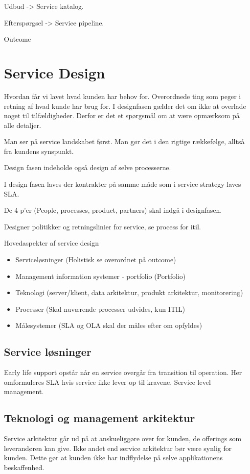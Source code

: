 Udbud -> Service katalog.

Efterspørgsel -> Service pipeline.

Outcome


\section{Service Design}
Hvordan får vi lavet hvad kunden har behov for. Overordnede ting som peger i retning af hvad kunde har brug for. I designfasen gælder det om ikke at overlade noget til tilfældigheder. Derfor er det et spørgsmål om at være opmærksom på alle detaljer.

Man ser på service landskabet først. Man gør det i den rigtige rækkefølge, alltså fra kundens synspunkt.

Design fasen indeholde også design af selve processerne.

I design fasen laves der kontrakter på samme måde som i service strategy laves SLA.

De 4 p'er (People, processes, product, partners) skal indgå i designfasen.

Designer politikker og retningslinier for service, se process for itil.

Hovedaspekter af service design
\begin{itemize}
\item Serviceløsninger (Holistisk se overordnet på outcome)
\item Management information systemer - portfolio (Portfolio)
\item Teknologi (server/klient, data arkitektur, produkt arkitektur, monitorering)
\item Processer (Skal nuværende processer udvides, kun ITIL)
\item Målesystemer (SLA og OLA skal der måles efter om opfyldes)
\end{itemize}

\subsection{Service løsninger}
Early life support opstår når en service overgår fra transition til operation. Her omformuleres SLA hvis service ikke lever op til kravene. Service level management.


\subsection{Teknologi og management arkitektur}
Service arkitektur går ud på at anskueliggøre over for kunden, de offerings som leverandøren kan give. Ikke andet end service arkitektur bør være synlig for kunden. Dette gør at kunden ikke har indflydelse på selve applikationens beskaffenhed.

